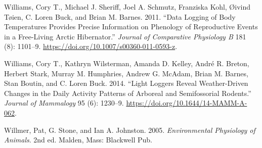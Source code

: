 \documentclass[msc,numbers,hidelinks]{coppe}
\newlength{\cslhangindent}
\newenvironment{cslreferences}%
  {\setlength{\parindent}{0pt}%
  \everypar{\setlength{\hangindent}{\cslhangindent}}\ignorespaces}%
  {\par}
\begin{document}
\begin{cslreferences}
  \leavevmode\hypertarget{ref-williamsDataLoggingBody2011}{}%
  Williams, Cory T., Michael J. Sheriff, Joel A. Schmutz, Franziska Kohl, Øivind Tøien, C. Loren Buck, and Brian M. Barnes. 2011. ``Data Logging of Body Temperatures Provides Precise Information on Phenology of Reproductive Events in a Free-Living Arctic Hibernator.'' \emph{Journal of Comparative Physiology B} 181 (8): 1101--9. \url{https://doi.org/10.1007/s00360-011-0593-z}.

  \leavevmode\hypertarget{ref-williamsLightLoggersReveal2014}{}%
  Williams, Cory T., Kathryn Wilsterman, Amanda D. Kelley, André R. Breton, Herbert Stark, Murray M. Humphries, Andrew G. McAdam, Brian M. Barnes, Stan Boutin, and C. Loren Buck. 2014. ``Light Loggers Reveal Weather-Driven Changes in the Daily Activity Patterns of Arboreal and Semifossorial Rodents.'' \emph{Journal of Mammalogy} 95 (6): 1230--9. \url{https://doi.org/10.1644/14-MAMM-A-062}.

  \leavevmode\hypertarget{ref-willmerEnvironmentalPhysiologyAnimals2005}{}%
  Willmer, Pat, G. Stone, and Ian A. Johnston. 2005. \emph{Environmental Physiology of Animals}. 2nd ed. Malden, Mass: Blackwell Pub.
  \end{cslreferences}
\end{document}
